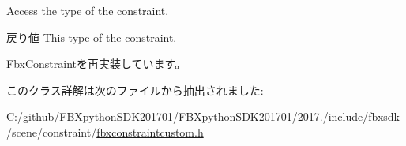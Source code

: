 Access the type of the constraint. \begin{DoxyReturn}{戻り値}
This type of the constraint. 
\end{DoxyReturn}


\hyperlink{class_fbx_constraint_adbeea66a1a605531a019aa6df90dc45b}{Fbx\+Constraint}を再実装しています。



このクラス詳解は次のファイルから抽出されました\+:\begin{DoxyCompactItemize}
\item 
C\+:/github/\+F\+B\+Xpython\+S\+D\+K201701/\+F\+B\+Xpython\+S\+D\+K201701/2017./include/fbxsdk/scene/constraint/\hyperlink{fbxconstraintcustom_8h}{fbxconstraintcustom.\+h}\end{DoxyCompactItemize}
